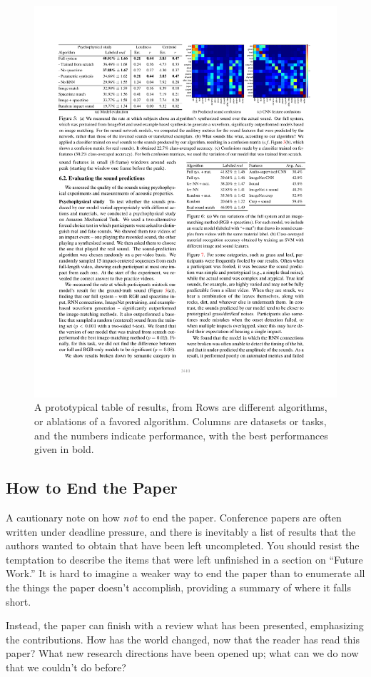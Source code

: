 \begin{figure}
\centerline{
\includegraphics[width=0.75\linewidth]{figures/papers/resultTable.pdf}}
\caption{A prototypical table of results, from \cite{Owens2016}  Rows are different algorithms, or ablations of a favored algorithm. Columns are datasets or tasks, and the numbers indicate performance, with the best performances given in bold. }
\label{resultsTable}
\end{figure}


\subsection{How to End the Paper}

A cautionary note on how {\em not} to end the paper.  Conference papers are often written under deadline pressure, and there is inevitably a list of results that the authors wanted to obtain that have been left uncompleted.  You should resist the temptation to describe the items that were left unfinished in a section on ``Future Work.''  It is hard to imagine a weaker way to end the paper than to enumerate all the things the paper doesn't accomplish, providing a summary of where it falls short.

Instead, the paper can finish with a review what has been presented, emphasizing the contributions.  How has the world changed, now that the reader has read this paper?  What new research directions have been opened up;  what can we do now that we couldn't do before?

